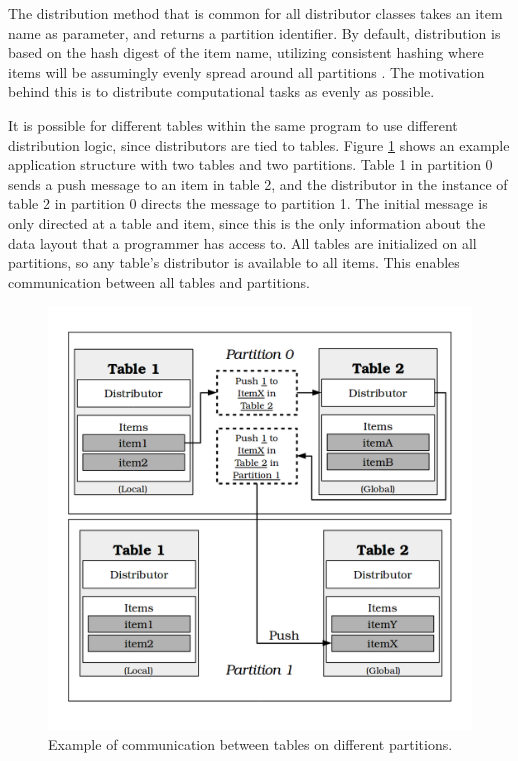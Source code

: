 \documentclass{uit-report}
\begin{document}
The distribution method that is common for all distributor classes takes an item name as parameter, and returns a partition identifier. By default, distribution is based on the hash digest of the item name, utilizing consistent hashing where items will be assumingly evenly spread around all partitions \cite{consistenthashing}. The motivation behind this is to distribute computational tasks as evenly as possible.

It is possible for different tables within the same program to use different distribution logic, since distributors are tied to tables. Figure \ref{fig:communication} shows an example application structure with two tables and two partitions. Table 1 in partition 0 sends a push message to an item in table 2, and the distributor in the instance of table 2 in partition 0 directs the message to partition 1. The initial message is only directed at a table and item, since this is the only information about the data layout that a programmer has access to. All tables are initialized on all partitions, so any table's distributor is available to all items. This enables communication between all tables and partitions.
\vspace{0.4cm}
\begin{figure}[H]
	\centering
	\includegraphics[width=13cm]{illustrations/png/communication.png}
	\caption{Example of communication between tables on different partitions.}
	\label{fig:communication}
\end{figure}
\end{document}
